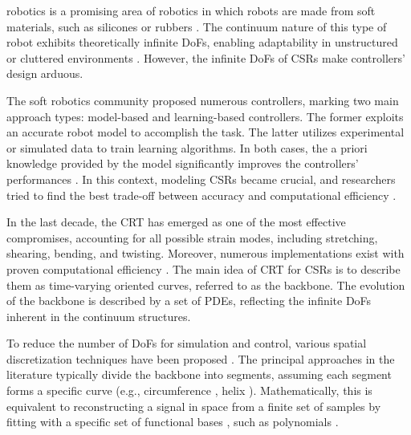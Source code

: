  robotics is a promising area of robotics in which robots are made from soft materials, such as silicones or rubbers  \cite{rus2015design}. 
The continuum nature of this type of robot exhibits theoretically infinite \ac{DoFs}, enabling adaptability in unstructured or cluttered environments \cite{del2024growing}. 
However, the infinite \ac{DoFs} of \acp{CSR} make controllers' design arduous. 

The soft robotics community proposed numerous controllers, marking two main approach types: model-based \cite{della2023model} and learning-based \cite{george2018control} controllers. The former exploits an accurate robot model to accomplish the task. The latter utilizes experimental or simulated data to train learning algorithms. In both cases, the a priori knowledge provided by the model significantly improves the controllers' performances \cite{falotico2024learning}. In this context, modeling \acp{CSR} became crucial, and researchers tried to find the best trade-off between accuracy and computational efficiency \cite{armanini2023soft}.

In the last decade, the \ac{CRT} \cite{renda2014dynamic, gazzola2018forward} has emerged as one of the most effective compromises, accounting for all possible strain modes, including stretching, shearing, bending, and twisting. Moreover, numerous implementations exist with proven computational efficiency \cite{mathew2022sorosim, naughton2021elastica}.
The main idea of \ac{CRT} for \acp{CSR} is to describe them as time-varying oriented curves, referred to as the backbone. The evolution of the backbone is described by a set of \acp{PDE}, reflecting the infinite \ac{DoFs} inherent in the continuum structures.

To reduce the number of \ac{DoFs} for simulation and control, various spatial discretization techniques have been proposed \cite{armanini2023soft}. The principal approaches in the literature typically divide the backbone into segments, assuming each segment forms a specific curve (e.g., circumference \cite{webster2010design}, helix \cite{grazioso2019geometrically}). 
Mathematically, this is equivalent to reconstructing a signal in space from a finite set of samples by fitting with a specific set of functional bases \cite{renda2020geometric, boyer2020dynamics}, such as polynomials \cite{della2019control}.

